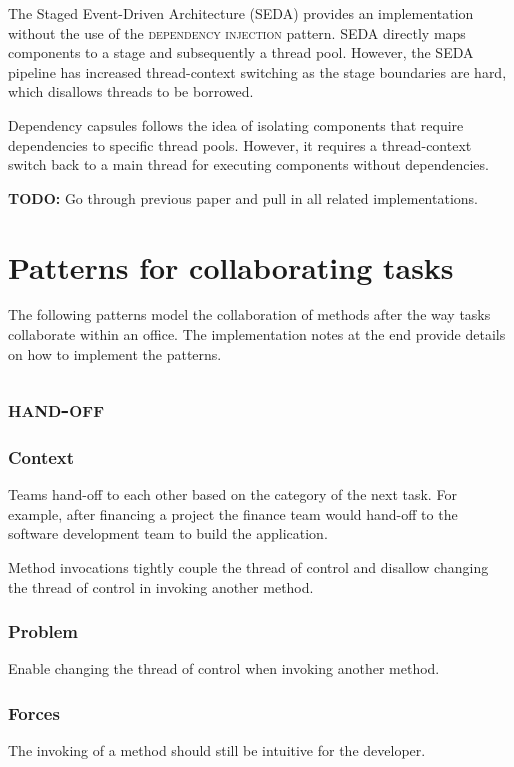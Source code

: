 \documentclass[prodmode]{style/acmlarge}
\begin{document}
The Staged Event-Driven Architecture (SEDA) \cite{seda} provides an
implementation without the use of the \textsc{dependency injection} pattern. 
SEDA directly maps components to a stage and subsequently a thread pool. 
However, the SEDA pipeline has increased thread-context switching as the stage
boundaries are hard, which disallows threads to be borrowed.

Dependency capsules \cite{dependency-capsules} follows the idea of isolating
components that require dependencies to specific thread pools.  However, it
requires a thread-context switch back to a main thread for executing components
without dependencies.

\textbf{TODO:} Go through previous paper and pull in all related implementations. 




\section{Patterns for collaborating tasks}

The following patterns model the collaboration of methods after the way tasks
collaborate within an office.  The implementation notes at the end provide
details on how to implement the patterns.


\subsection{\textsc{\textbf{hand-off}}}

\subsubsection*{Context} Teams hand-off to each other based on the category of
the next task.  For example, after financing a project the finance team would
hand-off to the software development team to build the application.

Method invocations tightly couple the thread of control and disallow changing
the thread of control in invoking another method.

\subsubsection*{Problem} Enable changing the thread of control when invoking another method.

\subsubsection*{Forces} The invoking of a method should still be intuitive for the developer.
\end{document}
